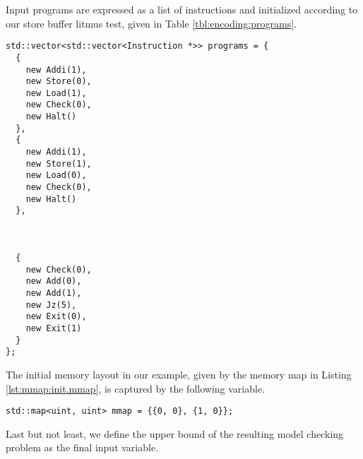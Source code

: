 \noindent
Input programs are expressed as a list of instructions and initialized according to our store buffer litmus test, given in Table \ref{tbl:encoding:programs}.
\begin{lstlisting}[style=c++]
std::vector<std::vector<Instruction *>> programs = {
  {
    new Addi(1),
    new Store(0),
    new Load(1),
    new Check(0),
    new Halt()
  },
  {
    new Addi(1),
    new Store(1),
    new Load(0),
    new Check(0),
    new Halt()
  },



  {
    new Check(0),
    new Add(0),
    new Add(1),
    new Jz(5),
    new Exit(0),
    new Exit(1)
  }
};
\end{lstlisting}
The initial memory layout in our example, given by the memory map in Listing \ref{lst:mmap:init.mmap}, is captured by the following variable.
\begin{lstlisting}[style=c++]
std::map<uint, uint> mmap = {{0, 0}, {1, 0}};
\end{lstlisting}
Last but not least, we define the upper bound of the resulting model checking problem as the final input variable.

